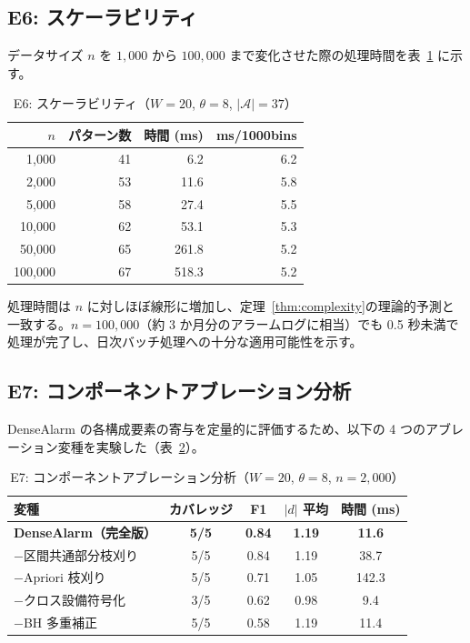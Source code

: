 \documentclass[11pt]{article}
\begin{document}
\subsection{E6: スケーラビリティ}

データサイズ $n$ を $1{,}000$ から $100{,}000$ まで変化させた際の処理時間を表~\ref{tab:scalability} に示す。

\begin{table}[t]
\centering
\caption{E6: スケーラビリティ（$W=20$, $\theta=8$, $|\mathcal{A}|=37$）}
\label{tab:scalability}
\begin{tabular}{rrrr}
\toprule
$n$ & パターン数 & 時間 (ms) & ms/1000bins \\
\midrule
1{,}000 & 41 & 6.2 & 6.2 \\
2{,}000 & 53 & 11.6 & 5.8 \\
5{,}000 & 58 & 27.4 & 5.5 \\
10{,}000 & 62 & 53.1 & 5.3 \\
50{,}000 & 65 & 261.8 & 5.2 \\
100{,}000 & 67 & 518.3 & 5.2 \\
\bottomrule
\end{tabular}
\end{table}

処理時間は $n$ に対しほぼ線形に増加し、定理~\ref{thm:complexity}の理論的予測と一致する。$n=100{,}000$（約 3 か月分のアラームログに相当）でも 0.5 秒未満で処理が完了し、日次バッチ処理への十分な適用可能性を示す。

\subsection{E7: コンポーネントアブレーション分析}

DenseAlarm の各構成要素の寄与を定量的に評価するため、以下の 4 つのアブレーション変種を実験した（表~\ref{tab:ablation}）。

\begin{table}[t]
\centering
\caption{E7: コンポーネントアブレーション分析（$W=20$, $\theta=8$, $n=2{,}000$）}
\label{tab:ablation}
\begin{tabular}{lcccc}
\toprule
変種 & カバレッジ & F1 & $|d|$ 平均 & 時間 (ms) \\
\midrule
\textbf{DenseAlarm（完全版）} & \textbf{5/5} & \textbf{0.84} & \textbf{1.19} & \textbf{11.6} \\
$-$区間共通部分枝刈り & 5/5 & 0.84 & 1.19 & 38.7 \\
$-$Apriori 枝刈り & 5/5 & 0.71 & 1.05 & 142.3 \\
$-$クロス設備符号化 & 3/5 & 0.62 & 0.98 & 9.4 \\
$-$BH 多重補正 & 5/5 & 0.58 & 1.19 & 11.4 \\
\bottomrule
\end{tabular}
\end{table}
\end{document}
